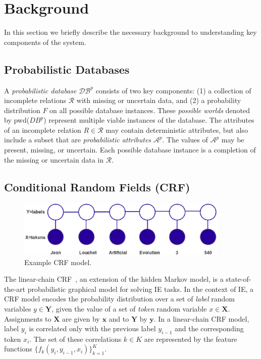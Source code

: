 \section{Background}
\label{sec:background}

In this section we briefly describe the necessary background to understanding key components of the \sysName system.
\subsection{Probabilistic Databases}

A \textit{probabilistic database} $\mathcal{DB}^{p}$ consists of two key components: (1) a collection of incomplete relations $\mathcal{R}$ with missing or uncertain data, and (2) a probability distribution $F$ on all possible database instances.  These \textit{possible worlds} denoted by pwd($DB^{p}$) represent multiple viable instances of the database.  The attributes of an incomplete relation $R \in \mathcal{R}$ may contain deterministic attributes, but also include a subset that are \textit{probabilistic attributes} $\mathcal{A}^{p}$.  The values of $\mathcal{A}^{p}$ may be present, missing, or uncertain.  Each possible database instance is a completion of the missing or uncertain data in $\mathcal{R}$.

\subsection{Conditional Random Fields (CRF)}
\label{sec:pi-crf}
\begin{figure}
        \includegraphics[width=0.9\textwidth]{CRF.eps}
        \caption{Example CRF model.}
        \label{fig:CRF}
\end{figure}

The linear-chain CRF~\cite{DBLP:conf/icml/LaffertyMP01,sutton06introduction}, an extension of the hidden Markov model, is a state-of-the-art probabilistic graphical model for solving IE tasks.  In the context of IE, a CRF model encodes the probability distribution over a set of \textit{label} random variables $y \in \mathbf{Y}$, given the value of a set of \textit{token} random variable $x \in \mathbf{X}$.  Assignments to $\mathbf{X}$ are given by $\mathbf{x}$ and to $\mathbf{Y}$ by $\mathbf{y}$.  In a linear-chain CRF model, label $y_{i}$ is correlated only with the previous label $y_{i-1}$ and the corresponding token $x_{i}$.  The set of these correlations $k \in K$ are represented by the feature functions $\{f_{k}(y_{i},y_{i-1},x_{i})\}^{K}_{k=1}$.

